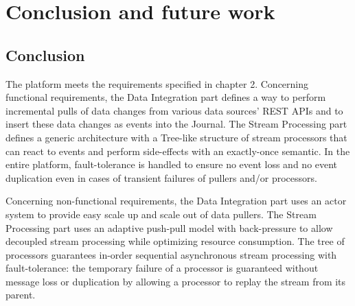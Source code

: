 \chapter{Conclusion and future work}

\section{Conclusion}

The platform meets the requirements specified in chapter 2. 
Concerning functional requirements, the Data Integration part defines a way to perform incremental pulls of data changes from various data sources' REST APIs and to insert these data changes as events into the Journal. The Stream Processing part defines a generic architecture with a Tree-like structure of stream processors that can react to events and perform side-effects with an exactly-once semantic. In the entire platform, fault-tolerance is handled to ensure no event loss and no event duplication even in cases of transient failures of pullers and/or processors.

Concerning non-functional requirements, the Data Integration part uses an actor system to provide easy scale up and scale out of data pullers. The Stream Processing part uses an adaptive push-pull model with back-pressure to allow decoupled stream processing while optimizing resource consumption. The tree of processors guarantees in-order sequential asynchronous stream processing with fault-tolerance: the temporary failure of a processor is guaranteed without message loss or duplication by allowing a processor to replay the stream from its parent.
\\

